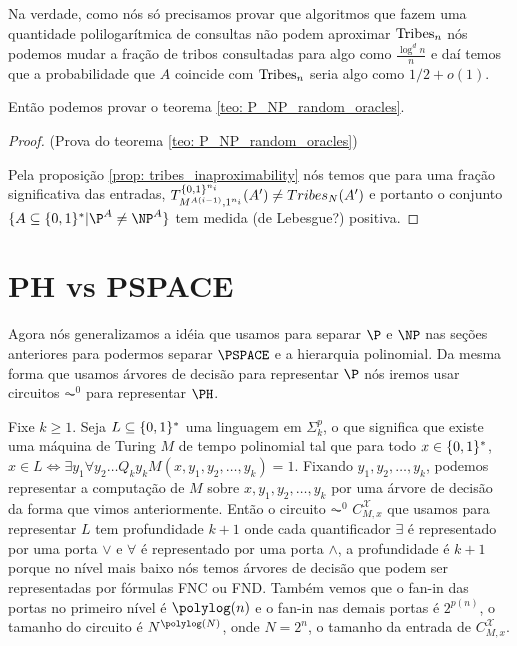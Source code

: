 Na verdade, como nós só precisamos provar que algoritmos que fazem uma quantidade polilogarítmica de consultas não podem aproximar $\text{Tribes}_{n}$ nós podemos mudar a fração de tribos consultadas para algo como $\frac{\log^{d} n}{n}$ e daí temos que a probabilidade que $A$ coincide com $\text{Tribes}_{n}$ seria algo como $1/2 + o(1)$.

\color{black}

Então podemos provar o teorema \ref{teo: P_NP_random_oracles}.

\begin{proof} (Prova do teorema \ref{teo: P_NP_random_oracles})

Pela proposição \ref{prop: tribes_inaproximability} nós temos que para uma fração significativa das entradas, $T_{M^{A(i - 1)}, 1^{n_{i}}}^{\{0, 1\}^{n_{i}}}(A^{\prime}) \neq Tribes_{N}(A^{\prime})$ e portanto o conjunto $\{A \subseteq \binalph^{*} \lvert \P^{A} \neq \NP^{A}\}$ tem medida (de Lebesgue?) positiva.

\end{proof}

\section{PH vs PSPACE}

Agora nós generalizamos a idéia que usamos para separar $\P$ e $\NP$ nas seções anteriores para podermos separar $\PSPACE$ e a hierarquia polinomial. Da mesma forma que usamos árvores de decisão para representar $\P$ nós iremos usar circuitos $\AC^{0}$ para representar $\PH$.

Fixe $k \geq 1$. Seja $L \subseteq \{0, 1\}^{*}$ uma linguagem em $\Sigma_{k}^{p}$, o que significa que existe uma máquina de Turing $M$ de tempo polinomial tal que para todo $x \in \{0, 1\}^{*}$, $x \in L \iff \exists y_{1} \forall y_{2} \dots Q_{k} y_{k} M(x, y_{1}, y_{2}, \dots, y_{k}) = 1$. Fixando ${y}_{1}, y_{2}, \dots, y_{k}$, podemos representar a computação de $M$ sobre $x, {y}_{1}, y_{2}, \dots, y_{k}$ por uma árvore de decisão da forma que vimos anteriormente. Então o circuito $\AC^{0}$ $C_{M, x}^{\mathcal{X}}$ que usamos para representar $L$ tem profundidade $k + 1$ onde cada quantificador $\exists$ é representado por uma porta $\lor$ e $\forall$ é representado por uma porta $\land$, a profundidade é $k + 1$ porque no nível mais baixo nós temos árvores de decisão que podem ser representadas por fórmulas FNC ou FND. Também vemos que o fan-in das portas no primeiro nível é $\polylog(n)$ e o fan-in nas demais portas é $2^{p(n)}$, o tamanho do circuito é $N^{\polylog(N)}$, onde $N = 2^{n}$, o tamanho da entrada de $C_{M, x}^{\mathcal{X}}$.

